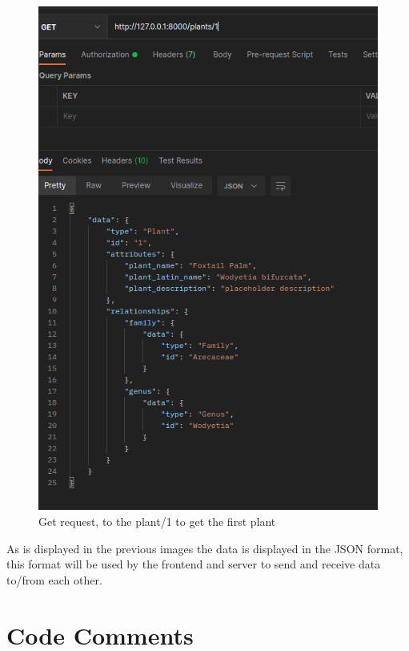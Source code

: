 \documentclass{article}
\begin{document}
    
    \begin{figure}[!htb]
        \centering
        \caption{Get request, to the plant/1 to get the first plant}
        \includegraphics[scale=0.50]{format5}
    \end{figure}

    As is displayed in the previous images the data is displayed in the JSON format, this format will be used by the frontend and server to send and receive data to/from each other.
    
    \newpage
    
    \part{Code Comments}
    \begin{spacing}{4}
    \end{spacing}
   
\end{document}
